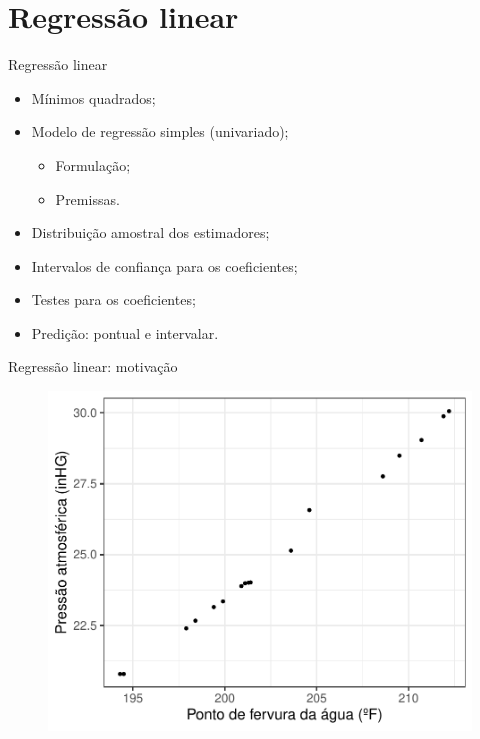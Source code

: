 \section{Regressão linear}
\begin{frame}{Regressão linear}
 \begin{itemize}
   \item Mínimos quadrados;
   \item Modelo de regressão simples (univariado);
   \begin{itemize}
    \item Formulação;
    \item Premissas.
   \end{itemize}
   \item Distribuição amostral dos estimadores;    
   \item Intervalos de confiança para os coeficientes;
   \item Testes para os coeficientes;
   \item Predição: pontual e intervalar.
   \end{itemize}
\end{frame} 

\begin{frame}{Regressão linear: motivação}
 \begin{figure}
  \begin{center}
   \includegraphics[scale=.6]{figures/pressure_data.pdf}
  \end{center}
 \end{figure}
\end{frame}


